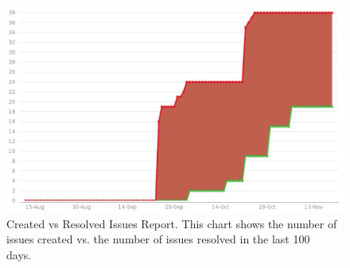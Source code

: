 \documentclass[a4paper,12pt]{book}
\begin{document}
{\begin{figure}[h]
  \centering
    \includegraphics[width=1.0\textwidth]{chart1}
    \caption{Created vs Resolved Issues Report. This chart shows the number of issues created vs. the number of issues resolved in the last 100 days.~\cite{jiraboard}}
\end{figure}
    
}
\end{document}
